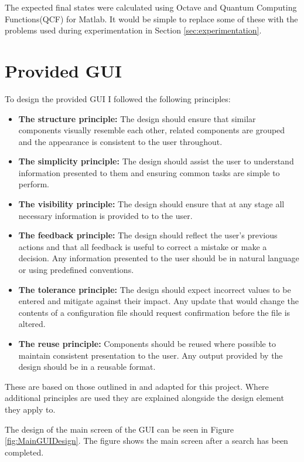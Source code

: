 The expected final states were calculated using Octave\cite{octweb} and Quantum Computing Functions(QCF) for Matlab\cite{qcfweb}.
It would be simple to replace some of these with the problems used during experimentation in Section \ref{sec:experimentation}.

\section{Provided GUI}
\label{sec:provgui}
To design the provided GUI I followed the following principles:
\begin{itemize}
 \item \textbf{The structure principle:} The design should ensure that similar components visually resemble each other, related components are grouped and the appearance is consistent to the user throughout.
\item \textbf{The simplicity principle:} The design should assist the user to understand information presented to them and ensuring common tasks are simple to perform.
\item \textbf{The visibility principle:} The design should ensure that at any stage all necessary information is provided to to the user.
\item \textbf{The feedback principle:} The design should reflect the user's previous actions and that all feedback is useful to correct a mistake or make a decision.
Any information presented to the user should be in natural language or using predefined conventions.
\item \textbf{The tolerance principle:} The design should expect incorrect values to be entered and mitigate against their impact.
Any update that would change the contents of a configuration file should request confirmation before the file is altered.
\item \textbf{The reuse principle:} Components should be reused where possible to maintain consistent presentation to the user.
Any output provided by the design should be in a reusable format.
\end{itemize}
These are based on those outlined in \cite{constantine1999software} and adapted for this project.
Where additional principles are used they are explained alongside the design element they apply to.

The design of the main screen of the GUI can be seen in Figure \ref{fig:MainGUIDesign}.
The figure shows the main screen after a search has been completed.

